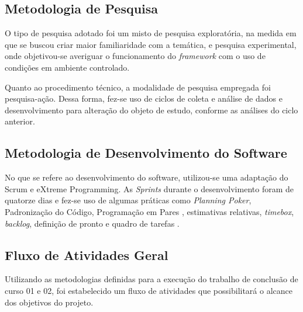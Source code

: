   \subsection{Metodologia de Pesquisa} \label{Metodologia de Pesquisa}
	O tipo de pesquisa adotado foi um misto de pesquisa exploratória, na medida em que se buscou criar maior familiaridade com a temática, e pesquisa experimental, onde objetivou-se averiguar o funcionamento do \textit{framework} com o uso de condições em ambiente controlado. 
  \par
  \indent Quanto ao procedimento técnico, a modalidade de pesquisa empregada foi pesquisa-ação. Dessa forma, fez-se uso de ciclos de coleta e análise de dados e desenvolvimento para alteração do objeto de estudo, conforme as análises do ciclo anterior.

 \subsection{Metodologia de Desenvolvimento do Software} \label{Metodologia de Desenvolvimento do Software}
  No que se refere ao desenvolvimento do software, utilizou-se uma adaptação do Scrum e eXtreme Programming. As \textit{Sprints} durante o desenvolvimento foram de quatorze dias e fez-se uso de algumas práticas como \textit{Planning Poker}, Padronização do Código, Programação em Pares \cite{wells2009}, estimativas relativas, \textit{timebox}, \textit{backlog}, definição de pronto e quadro de tarefas \cite{scrum2014}. 
 
 \subsection{Fluxo de Atividades Geral}
 	
 	Utilizando as metodologias definidas para a execução do trabalho de conclusão de curso 01 e 02, foi estabelecido um fluxo de atividades que possibilitará o alcance dos objetivos do projeto.
 	
